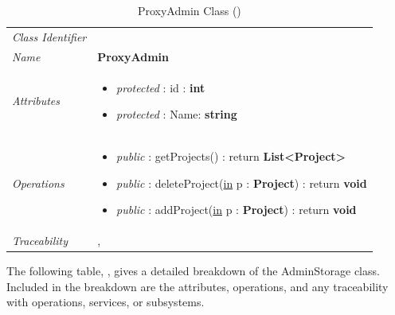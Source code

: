 \documentclass[12pt,letterpaper]{article}
\begin{document}
\begin{table}[H]
    \caption{ProxyAdmin Class ()} 
	\begin{tabu} to 
		\toprule
		Class Identifier &  \\
		Name & {\bf ProxyAdmin} \\
		Attributes & 
		\begin{minipage}[t]{\linewidth}
		    \begin{itemize}
		        \item \textit{protected} : id : {\bf int}
		        \item \textit{protected} : Name: {\bf string}
			\end{itemize}
	    \end{minipage} \\

		Operations &
		\begin{minipage}[t]{\linewidth}
			\begin{itemize}
			    \item {\it public} : getProjects() : return {\bf List<Project>}
			    \item {\it public} : deleteProject(\underline{in} p : {\bf Project}) : return {\bf void}
			    \item {\it public} : addProject(\underline{in} p : {\bf Project}) : return {\bf void}
	        \end{itemize}
	    \end{minipage} \\
	    	Traceability & , \\
		\toprule
	\end{tabu}
\end{table}

The following table, , gives a detailed breakdown of the AdminStorage class. Included in the breakdown are the attributes, operations, and any traceability with operations, services, or subsystems.
\end{document}
